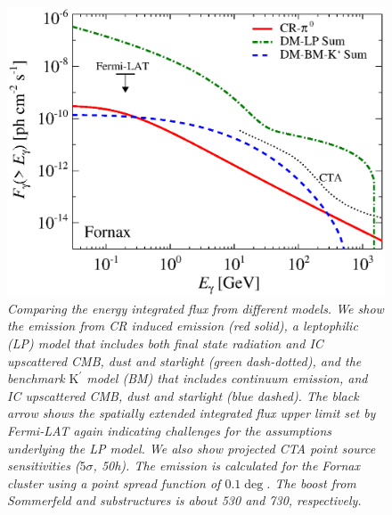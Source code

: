 \documentclass[10pt,aps,pra,reprint,amsmath,amsfonts,amssymb,showpacs,nofootinbib,floatfix]{revtex4-1}
\newcommand{\Fermi}{{\em Fermi}\xspace}
\newcommand{\rmn}{\mathrm}
\newcommand{\Kp}{\rmn{K}^\prime}
\begin{document}
\begin{figure}
 \includegraphics[width=0.99\columnwidth]{figures/flux.int.v13.0.1deg.1.6T.SubMass.SF700.IR2.noMW.woGal.eps}
 \caption{\it Comparing the energy integrated flux from different
   models. We show the emission from CR induced emission (red solid),
   a leptophilic (LP) model that includes both final state radiation
   and IC upscattered CMB, dust and starlight (green dash-dotted), and
   the benchmark $\Kp$ model (BM) that includes continuum emission,
   and IC upscattered CMB, dust and starlight (blue dashed). The black
   arrow shows the spatially extended integrated flux upper limit set
   by \Fermi-LAT again indicating challenges for the assumptions
   underlying the LP model. We also show projected CTA point source
   sensitivities ($5\sigma$, 50h). The emission is calculated for the
   Fornax cluster using a point spread function of $0.1\deg$. The
   boost from Sommerfeld and substructures is about 530 and 730,
   respectively.}
 \label{fig:flux_int}
\end{figure}
\end{document}
